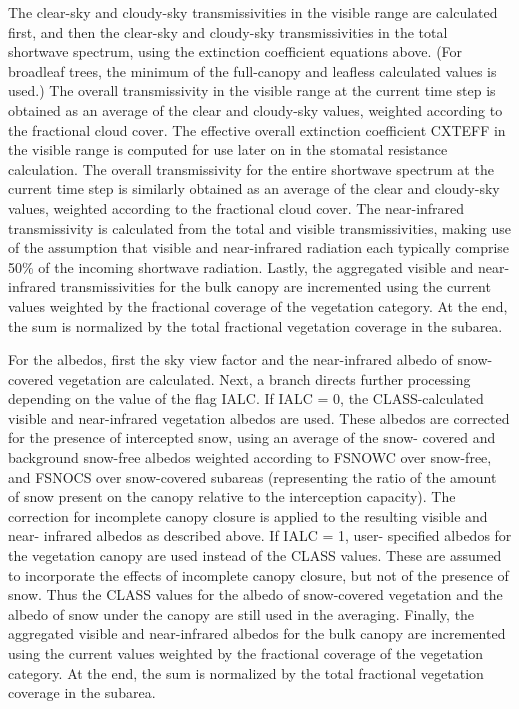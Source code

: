 The clear-\/sky and cloudy-\/sky transmissivities in the visible range are calculated first, and then the clear-\/sky and cloudy-\/sky transmissivities in the total shortwave spectrum, using the extinction coefficient equations above. (For broadleaf trees, the minimum of the full-\/canopy and leafless calculated values is used.) The overall transmissivity in the visible range at the current time step is obtained as an average of the clear and cloudy-\/sky values, weighted according to the fractional cloud cover. The effective overall extinction coefficient C\+X\+T\+E\+F\+F in the visible range is computed for use later on in the stomatal resistance calculation. The overall transmissivity for the entire shortwave spectrum at the current time step is similarly obtained as an average of the clear and cloudy-\/sky values, weighted according to the fractional cloud cover. The near-\/infrared transmissivity is calculated from the total and visible transmissivities, making use of the assumption that visible and near-\/infrared radiation each typically comprise 50\% of the incoming shortwave radiation. Lastly, the aggregated visible and near-\/infrared transmissivities for the bulk canopy are incremented using the current values weighted by the fractional coverage of the vegetation category. At the end, the sum is normalized by the total fractional vegetation coverage in the subarea.

For the albedos, first the sky view factor and the near-\/infrared albedo of snow-\/covered vegetation are calculated. Next, a branch directs further processing depending on the value of the flag I\+A\+L\+C. If I\+A\+L\+C = 0, the C\+L\+A\+S\+S-\/calculated visible and near-\/infrared vegetation albedos are used. These albedos are corrected for the presence of intercepted snow, using an average of the snow-\/ covered and background snow-\/free albedos weighted according to F\+S\+N\+O\+W\+C over snow-\/free, and F\+S\+N\+O\+C\+S over snow-\/covered subareas (representing the ratio of the amount of snow present on the canopy relative to the interception capacity). The correction for incomplete canopy closure is applied to the resulting visible and near-\/ infrared albedos as described above. If I\+A\+L\+C = 1, user-\/ specified albedos for the vegetation canopy are used instead of the C\+L\+A\+S\+S values. These are assumed to incorporate the effects of incomplete canopy closure, but not of the presence of snow. Thus the C\+L\+A\+S\+S values for the albedo of snow-\/covered vegetation and the albedo of snow under the canopy are still used in the averaging. Finally, the aggregated visible and near-\/infrared albedos for the bulk canopy are incremented using the current values weighted by the fractional coverage of the vegetation category. At the end, the sum is normalized by the total fractional vegetation coverage in the subarea.

